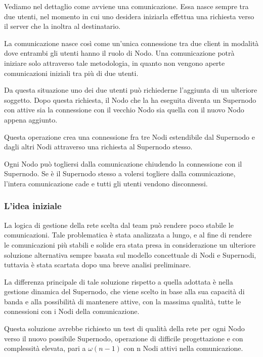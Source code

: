 Vediamo nel dettaglio come avviene una comunicazione. Essa nasce sempre tra due utenti, nel momento in cui uno desidera iniziarla effettua una richiesta verso il server che la inoltra al destinatario.

La comunicazione nasce così come un'unica connessione tra due client in modalità \underline{} dove entrambi gli utenti hanno il ruolo di Nodo. Una comunicazione potrà iniziare solo attraverso tale metodologia, in quanto non vengono aperte comunicazioni iniziali tra più di due utenti.

Da questa situazione uno dei due utenti può richiederne l'aggiunta di un ulteriore soggetto. Dopo questa richiesta, il Nodo che la ha eseguita diventa un Supernodo con attive sia la connessione con il vecchio Nodo sia quella con il nuovo Nodo appena aggiunto.

Questa operazione crea una connessione fra tre Nodi estendibile dal Supernodo e dagli altri Nodi attraverso una richiesta al Supernodo stesso. 

Ogni Nodo può togliersi dalla comunicazione chiudendo la connessione con il Supernodo. Se è il Supernodo stesso a volersi togliere dalla comunicazione, l'intera comunicazione cade e tutti gli utenti vendono disconnessi.

\subsubsection{L'idea iniziale}
La logica di gestione della rete scelta dal team può rendere poco stabile le comunicazioni. Tale problematica è stata analizzata a lungo, e al fine di rendere le comunicazioni più stabili e solide era stata presa in considerazione un ulteriore soluzione alternativa sempre basata sul modello concettuale di Nodi e Supernodi, tuttavia è stata scartata dopo una breve analisi preliminare.

La differenza principale di tale soluzione rispetto a quella adottata è nella gestione dinamica del Supernodo, che viene scelto in base alla sua capacità di banda e alla possibilità di mantenere attive, con la massima qualità, tutte le connessioni con i Nodi della comunicazione.

Questa soluzione avrebbe richiesto un test di qualità della rete per ogni Nodo verso il nuovo possibile Supernodo, operazione di difficile progettazione e con complessità elevata, pari a $\omega(n-1)$ con n Nodi attivi nella comunicazione.

